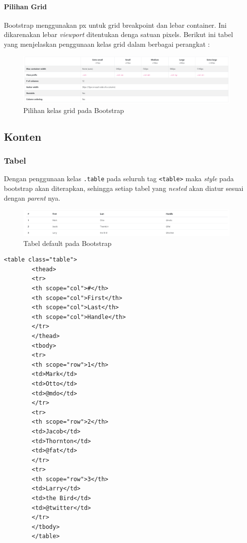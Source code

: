 \documentclass[a4paper,twoside]{article}
\begin{document}
\begin{enumerate}
	\paragraph{Pilihan Grid}
		Bootstrap menggunakan px untuk grid breakpoint dan lebar container. Ini dikarenakan lebar \textit{viewport} ditentukan denga satuan pixels.
		Berikut ini tabel yang menjelaskan penggunaan kelas grid dalam berbagai perangkat :
		\begin{figure} [H]
			\centering  
			\includegraphics[scale=0.7]{gridoption_bootstrap.png}  
			\caption{Pilihan kelas grid pada Bootstrap} 
		\end{figure}
		
		\subsection{Konten}
		\subsubsection{Tabel}
		Dengan penggunaan kelas \verb|.table| pada seluruh tag \texttt{<table>} maka \textit{style} pada bootstrap akan diterapkan, sehingga setiap tabel yang \textit{nested} akan diatur sesuai dengan \textit{parent} nya.
		\begin{figure} [H]
			\centering  
			\includegraphics[scale=0.7]{tablebasic_bootstrap.png}  
			\caption{Tabel default pada Bootstrap} 
		\end{figure}
		
		\begin{lstlisting}[frame=single] 
		<table class="table">
		<thead>
		<tr>
		<th scope="col">#</th>
		<th scope="col">First</th>
		<th scope="col">Last</th>
		<th scope="col">Handle</th>
		</tr>
		</thead>
		<tbody>
		<tr>
		<th scope="row">1</th>
		<td>Mark</td>
		<td>Otto</td>
		<td>@mdo</td>
		</tr>
		<tr>
		<th scope="row">2</th>
		<td>Jacob</td>
		<td>Thornton</td>
		<td>@fat</td>
		</tr>
		<tr>
		<th scope="row">3</th>
		<td>Larry</td>
		<td>the Bird</td>
		<td>@twitter</td>
		</tr>
		</tbody>
		</table>
		\end{lstlisting}
		

\end{enumerate}
\end{document}
